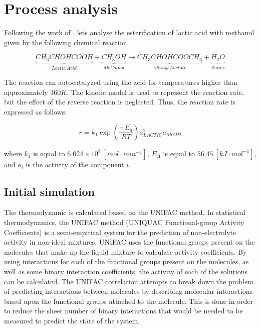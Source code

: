 \chapter{Process analysis}

Following the work of \cite{SegoviaHernandez2020}, lets analyse the esterification of lactic acid with methanol given by the following chemical reaction

\begin{equation}
	\underbrace{CH_3CHOHCOOH}_{Lactic~Acid} + \underbrace{CH_3OH}_{Methanol} \rightarrow \underbrace{CH_3CHOHCOOCH_3}_{Methyl~Lactate} + \underbrace{H_2O}_{Water}
\end{equation}

The reaction can autocatalyzed using the acid for temperatures higher than approximately $360 K$. The kinetic model is used to represent the reaction rate, but the effect of the reverse reaction is neglected. Thus, the reaction rate is expressed as follows:

\begin{equation}
	r = k_1 \exp\left( \frac{-E_a}{RT} \right) a^2_{LACTIC} a_{MeOH}
\end{equation}

where $k_1$ is equal to $6.024 \times 10^8 ~[mol \cdot min^{-1}]$, $E_A$ is equal to $56.45~[kJ\cdot mol^{-1}]$, and $a_i$ is the activity of the component $i$.

\section{Initial simulation}

The thermodynamic is calculated based on the UNIFAC method. In statistical thermodynamics, the UNIFAC method (UNIQUAC Functional-group Activity Coefficients) is a semi-empirical system for the prediction of non-electrolyte activity in non-ideal mixtures. UNIFAC uses the functional groups present on the molecules that make up the liquid mixture to calculate activity coefficients. By using interactions for each of the functional groups present on the molecules, as well as some binary interaction coefficients, the activity of each of the solutions can be calculated. The UNIFAC correlation attempts to break down the problem of predicting interactions between molecules by describing molecular interactions based upon the functional groups attached to the molecule. This is done in order to reduce the sheer number of binary interactions that would be needed to be measured to predict the state of the system.


